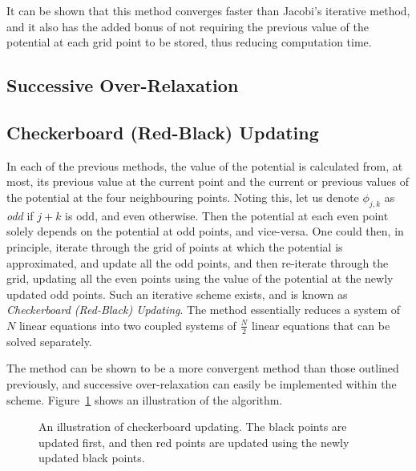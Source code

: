 \documentclass[12pt, a4paper]{article}
\begin{document}
It can be shown that this method converges faster than Jacobi's iterative
method, and it also has the added bonus of not requiring the previous value of the 
potential at each grid point to be stored, thus reducing computation time.

\subsection{Successive Over-Relaxation}
%

\subsection{Checkerboard (Red-Black) Updating}

In each of the previous methods, the value of the potential is calculated from, at most,
its previous value at the current point and the current or previous values of the
potential at the four neighbouring points. Noting this, let us denote $\phi_{j,k}$ as
\emph{odd} if $j+k$ is odd, and even otherwise. Then the potential at each even point
solely depends on the potential at odd points, and vice-versa. One could then, in
principle, iterate through the grid of points at which the potential is approximated,
and update all the odd points, and then re-iterate through the grid, updating all the
even points using the value of the potential at the newly updated odd points. Such an
iterative scheme exists, and is known as \emph{Checkerboard (Red-Black) Updating}. The
method essentially reduces a system of $N$ linear equations into two coupled systems
of $\frac{N}{2}$ linear equations that can be solved separately.

The method can be shown to be a more convergent method than those outlined previously,
and successive over-relaxation can easily be implemented within the scheme.
Figure~\ref{fig:checker} shows an illustration of the algorithm.

\begin{figure}[h!]
\begin{center}
\end{center}
\caption{An illustration of checkerboard updating. The black points are updated first,
and then red points are updated using the newly updated black points.}
\label{fig:checker}
\end{figure}
\end{document}
